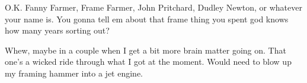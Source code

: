 

O.K. Fanny Farmer, Frame Farmer, John Pritchard, Dudley Newton, or
whatever your name is.  You gonna tell em about that frame thing you
spent god knows how many years sorting out?

Whew, maybe in a couple when I get a bit more brain matter going on.
That one's a wicked ride through what I got at the moment.  Would need
to blow up my framing hammer into a jet engine.

\bye
